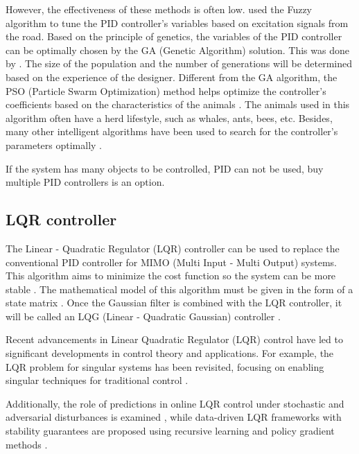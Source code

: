 	However, the effectiveness of these methods is often low. \cite{chen2018modelling} used the Fuzzy algorithm to tune the PID controller's variables based on excitation signals from the road. Based on the principle of genetics, the variables of the PID controller can be optimally chosen by the GA (Genetic Algorithm) solution. This was done by \cite{metered2018optimized}.
	The size of the population and the number of generations will be determined based on the experience of the designer. Different from the GA algorithm, the PSO (Particle Swarm Optimization) method helps optimize the controller's coefficients based on the characteristics of the animals \cite{al2015quarter}. The animals used in this algorithm often have a herd lifestyle, such as whales, ants, bees, etc.  Besides, many other intelligent algorithms have been used to search for the controller's parameters optimally \cite{dahunsi2020proportional+}. 

	If the system has many objects to be controlled, PID can not be used, buy multiple PID controllers is an option\cite{nguyen2021improving}. 
	
\subsection{LQR controller}
	The Linear - Quadratic Regulator (LQR) controller can be used to replace the conventional PID controller for MIMO (Multi Input - Multi Output) systems\cite{wu2021multi}. This algorithm aims to minimize the cost function so the system can be more stable \cite{rodriguez2021active}. The mathematical model of this algorithm must be given in the form of a state matrix \cite{nguyen2022application}. Once the Gaussian filter is combined with the LQR controller, it will be called an LQG (Linear - Quadratic Gaussian) controller \cite{xia2015linear}.\newline
	
	Recent advancements in Linear Quadratic Regulator (LQR) control have led to significant developments in control theory and applications. For example, the LQR problem for singular systems has been revisited, focusing on enabling singular techniques for traditional control \cite{lqr_singular_systems}.
	
	Additionally, the role of predictions in online LQR control under stochastic and adversarial disturbances is examined \cite{lqr_predictions}, while data-driven LQR frameworks with stability guarantees are proposed using recursive learning and policy gradient methods \cite{lqr_stability_recursive}. 
	
